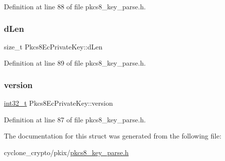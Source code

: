 Definition at line 88 of file pkcs8\+\_\+key\+\_\+parse.\+h.

\mbox{\label{structPkcs8EcPrivateKey_abd745dc89a69991f28d34ced7905bd2a}} 
\subsubsection{\texorpdfstring{d\+Len}{dLen}}
{\footnotesize\ttfamily size\+\_\+t Pkcs8\+Ec\+Private\+Key\+::d\+Len}



Definition at line 89 of file pkcs8\+\_\+key\+\_\+parse.\+h.

\mbox{\label{structPkcs8EcPrivateKey_a4cd85ed9dc55493823c0066128624265}} 
\subsubsection{\texorpdfstring{version}{version}}
{\footnotesize\ttfamily \hyperlink{stdint_8h_ab1967d8591af1a4e48c37fd2b0f184d0}{int32\+\_\+t} Pkcs8\+Ec\+Private\+Key\+::version}



Definition at line 87 of file pkcs8\+\_\+key\+\_\+parse.\+h.



The documentation for this struct was generated from the following file\+:\begin{DoxyCompactItemize}
\item 
cyclone\+\_\+crypto/pkix/\hyperlink{pkcs8__key__parse_8h}{pkcs8\+\_\+key\+\_\+parse.\+h}\end{DoxyCompactItemize}

